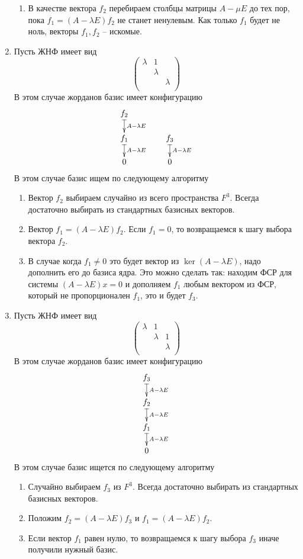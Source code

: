 \documentclass{article}
\begin{document}
\begin{enumerate}
\begin{enumerate}
\item В качестве вектора $f_2$ перебираем столбцы матрицы $A - \mu E$ до тех пор, пока $f_1 = (A - \lambda E) f_2$ не станет ненулевым. Как только $f_1$ будет не ноль, векторы $f_1, f_2$ -- искомые.
\end{enumerate}

\item Пусть ЖНФ имеет вид
\[
\begin{pmatrix}
{\lambda}&{1}&{}\\
{}&{\lambda}&{}\\
{}&{}&{\lambda}\\
\end{pmatrix}
\]
В этом случае жорданов базис имеет конфигурацию
\[
\xymatrix@R=15pt@C=40pt{
  {f_2}\ar@{|->}[d]^{A-\lambda E}&{}\\
  {f_1}\ar@{|->}[d]^{A-\lambda E}&{f_3}\ar@{|->}[d]^{A-\lambda E}\\
  {0}&{0}
}
\]
В этом случае базис ищем по следующему алгоритму
\begin{enumerate}
\item Вектор $f_2$ выбираем случайно из всего пространства $F^3$. Всегда достаточно выбирать из стандартных базисных векторов.

\item Вектор $f_1 = (A - \lambda E) f_2$. Если $f_1 = 0$, то возвращаемся к шагу выбора вектора $f_2$.

\item В случае когда $f_1\neq 0$ это будет вектор из $\ker (A - \lambda E)$, надо дополнить его до базиса ядра. Это можно сделать так: находим ФСР для системы $(A - \lambda E) x = 0$ и дополняем $f_1$ любым вектором из ФСР, который не пропорционален $f_1$, это и будет $f_3$.
\end{enumerate}

\item Пусть ЖНФ имеет вид
\[
\begin{pmatrix}
{\lambda}&{1}&{}\\
{}&{\lambda}&{1}\\
{}&{}&{\lambda}\\
\end{pmatrix}
\]
В этом случае жорданов базис имеет конфигурацию
\[
\xymatrix@R=15pt@C=40pt{
  {f_3}\ar@{|->}[d]^{A-\lambda E}\\
  {f_2}\ar@{|->}[d]^{A-\lambda E}\\
  {f_1}\ar@{|->}[d]^{A-\lambda E}\\
  {0}
}
\]
В этом случае базис ищется по следующему алгоритму
\begin{enumerate}
\item Случайно выбираем $f_3$ из $F^3$. Всегда достаточно выбирать из стандартных базисных векторов.

\item Положим $f_2 = (A - \lambda E) f_3$ и $f_1 = (A - \lambda E) f_2$.

\item Если вектор $f_1$ равен нулю, то возвращаемся к шагу выбора $f_3$ иначе получили нужный базис.
\end{enumerate}

\end{enumerate}
\end{document}
